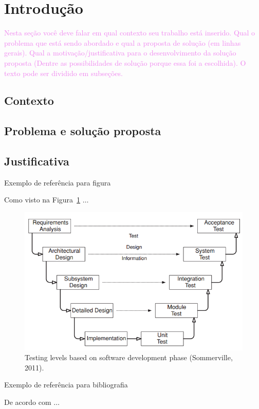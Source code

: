 \newpage
\section{Introdução}
\label{sec:introducao}

\textcolor{violet}{Nesta seção você deve falar em  qual contexto seu trabalho está inserido. 
Qual o problema que está sendo abordado e qual a proposta de solução (em linhas gerais). 
Qual a motivação/justificativa para o desenvolvimento da solução proposta (Dentre as possibilidades de solução porque essa foi a escolhida). O texto pode ser dividido em subseções.} 
\subsection{Contexto}
\subsection{Problema e solução proposta}
\subsection{Justificativa}

Exemplo de referência para figura

Como visto na Figura~\ref{fig:lifecycle_phase} $\ldots$

\begin{figure}[ht]
    \center
    \includegraphics[scale=0.7]{images/lifecycle_phase.png}
    \caption{Testing levels based on software development phase (Sommerville, 2011).}
    \label{fig:lifecycle_phase}
\end{figure}

Exemplo de referência para bibliografia

De acordo com \cite{sommerville2011software} $\ldots$
